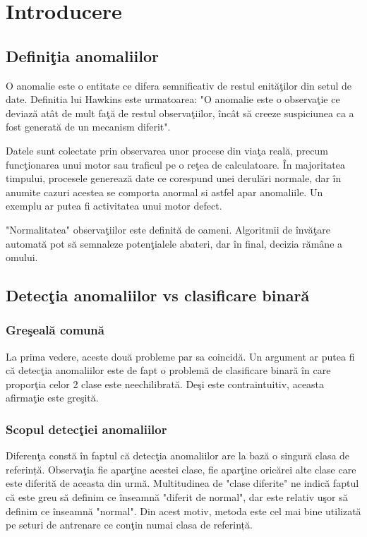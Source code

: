\chapter{Introducere}

\section{Definiţia anomaliilor}

O anomalie este o entitate ce difera semnificativ de restul enităţilor din 
setul de date. Definitia lui Hawkins este urmatoarea\cite{Identification of Outliers}:
"O anomalie este o observaţie ce deviază atât de mult faţă de restul observaţiilor,
încât să creeze suspiciunea ca a fost generată de un mecanism diferit".

Datele sunt colectate prin observarea unor procese din viaţa reală, precum funcţionarea
unui motor sau traficul pe o reţea de calculatoare. În majoritatea timpului, procesele
generează date ce corespund unei derulări normale, dar în anumite cazuri acestea se 
comporta anormal si astfel apar anomaliile. Un exemplu ar putea fi activitatea unui
motor defect.

"Normalitatea" observaţiilor este definită
de oameni. Algoritmii de învăţare automată pot să semnaleze potenţialele
abateri, dar în final, decizia rămâne a omului.

\section{Detecţia anomaliilor vs clasificare binară}

\subsection{Greşeală comună}

La prima vedere, aceste două probleme par sa coincidă. Un argument ar putea fi că 
detecţia anomaliilor este de fapt o problemă de clasificare binară în care proporţia
celor 2 clase este neechilibrată. Deşi este contraintuitiv, aceasta 
afirmaţie este greşită.

\subsection{Scopul detecţiei anomaliilor}

Diferenţa constă în faptul că detecţia anomaliilor are la bază o singură clasa
de referință. Observaţia fie aparţine acestei clase, fie aparţine oricărei alte clase 
care este diferită de aceasta din urmă. Multitudinea de "clase diferite" ne indică
faptul că este greu să definim ce înseamnă "diferit de normal", dar este relativ uşor
să definim ce înseamnă "normal".
Din acest motiv, 
metoda este cel mai bine utilizată pe seturi de antrenare ce conţin numai clasa de 
referință.

